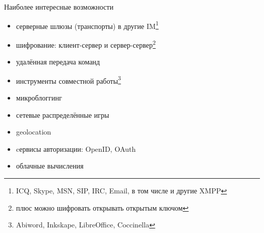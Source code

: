 \begin{frame}{Наиболее интересные возможности}
  \begin{itemize}
    \item серверные шлюзы (транспорты) в другие IM\footnote{ICQ, Skype, MSN, SIP, IRC, Email, в том числе и другие XMPP}
    \item шифрование: клиент-сервер и сервер-сервер\footnote{плюс можно шифровать открывать открытым ключом}
    \item удалённая передача команд
    \item инструменты совместной работы\footnote{Abiword, Inkskape, LibreOffice, Coccinella}
    \item микроблоггинг
    \item сетевые распределённые игры
    \item geolocation
    \item cервисы авторизации: OpenID, OAuth
    \item облачные вычисления
  \end{itemize}

\end{frame}

